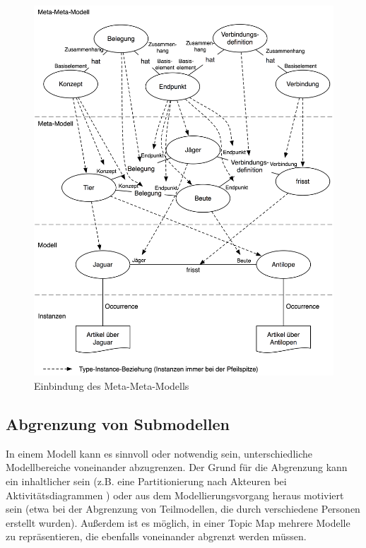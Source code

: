 \begin{figure}[htbp]
	\centering
		\includegraphics[width=13cm]{img/Persistenz/MetaMetaModelDef.png}
	\caption{Einbindung des Meta-Meta-Modells}
	\label{fig:img_Persistenz_MetaMetaModelDef}
\end{figure}


\subsection{Abgrenzung von Submodellen}
\label{sub:abgrenzung_von_submodellen}

In einem Modell kann es sinnvoll oder notwendig sein, unterschiedliche Modellbereiche voneinander abzugrenzen. Der Grund für die Abgrenzung kann ein inhaltlicher sein (z.B. eine Partitionierung nach Akteuren bei Aktivitätsdiagrammen \citep{Rumbaugh04}) oder aus dem Modellierungsvorgang heraus motiviert sein (etwa bei der Abgrenzung von Teilmodellen, die durch verschiedene Personen erstellt wurden). Außerdem ist es möglich, in einer Topic Map mehrere Modelle zu repräsentieren, die ebenfalls voneinander abgrenzt werden müssen.

